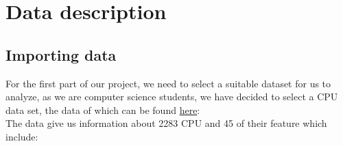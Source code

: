 %
%   
\clearpage
\section{Data description}










\subsection{Importing data}
For the first part of our project, we need to select a suitable dataset for us to analyze, as we are computer science students, we have decided to select a CPU data set, the data of which can be found \href{https://www.kaggle.com/datasets/iliassekkaf/computerparts?select=Intel_CPUs.csv}{here}:
\\
The data give us information about 2283 CPU and 45 of their feature which include:
\\
